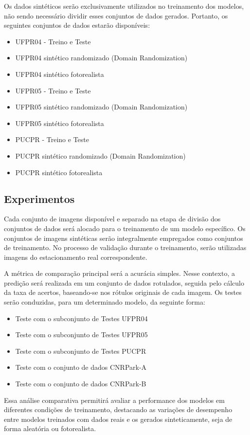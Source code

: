 Os dados sintéticos serão exclusivamente utilizados no treinamento dos modelos, não sendo necessário dividir esses conjuntos de dados gerados. Portanto, os seguintes conjuntos de dados estarão disponíveis:

\begin{itemize}
    \item UFPR04 - Treino e Teste
    \item UFPR04 sintético randomizado (Domain Randomization)
    \item UFPR04 sintético fotorealista
    \item UFPR05 - Treino e Teste
    \item UFPR05 sintético randomizado (Domain Randomization)
    \item UFPR05 sintético fotorealista
    \item PUCPR - Treino e Teste
    \item PUCPR sintético randomizado (Domain Randomization)
    \item PUCPR sintético fotorealista
\end{itemize}

\subsection{Experimentos}

Cada conjunto de imagens disponível e separado na etapa de divisão dos conjuntos de dados será alocado para o treinamento de um modelo específico. Os conjuntos de imagens sintéticas serão integralmente empregados como conjuntos de treinamento. No processo de validação durante o treinamento, serão utilizadas imagens do estacionamento real correspondente.

A métrica de comparação principal será a acurácia simples. Nesse contexto, a predição será realizada em um conjunto de dados rotulados, seguida pelo cálculo da taxa de acertos, baseando-se nos rótulos originais de cada imagem. Os testes serão conduzidas, para um determinado modelo, da seguinte forma:

\begin{itemize}
    \item Teste com o subconjunto de Testes UFPR04
    \item Teste com o subconjunto de Testes UFPR05
    \item Teste com o subconjunto de Testes PUCPR
    \item Teste com o conjunto de dados CNRPark-A
    \item Teste com o conjunto de dados CNRPark-B
\end{itemize}

Essa análise comparativa permitirá avaliar a performance dos modelos em diferentes condições de treinamento, destacando as variações de desempenho entre modelos treinados com dados reais e os gerados sinteticamente, seja de forma aleatória ou fotorealista.


